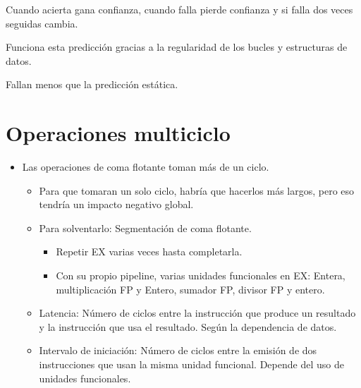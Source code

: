 \documentclass[12pt, twoside, openright]{report} %
\begin{document}
\begin{itemize}
\begin{itemize}
  Cuando acierta gana confianza, cuando falla pierde confianza y si falla dos veces seguidas cambia.

  Funciona esta predicción gracias a la regularidad de los bucles y estructuras de datos.

  Fallan menos que la predicción estática.
  
  \begin{figure}[H]
    {\def\svgwidth{.8\textwidth}
  }
  \end{figure}

  
\end{itemize}
    
\end{itemize}

\section{Operaciones multiciclo}

\begin{itemize}
\item Las operaciones de coma flotante toman más de un ciclo.
\begin{itemize}
  \item Para que tomaran un solo ciclo, habría que hacerlos más largos, pero eso tendría un impacto negativo global.
  \item Para solventarlo: Segmentación de coma flotante.
  \begin{itemize}
    \item Repetir EX varias veces hasta completarla.
    \item Con su propio pipeline, varias unidades funcionales en EX: Entera, multiplicación FP y Entero, sumador FP, divisor FP y entero.
    \begin{figure}[H]
      {\def\svgwidth{.8\textwidth}
  }
    \end{figure}
  
  \end{itemize}
      
  \item Latencia: Número de ciclos entre la instrucción que produce un resultado y la instrucción que usa el resultado. Según la dependencia de datos.
  
  \item Intervalo de iniciación: Número de ciclos entre la emisión de dos instrucciones que usan la misma unidad funcional. Depende del uso de unidades funcionales.
\end{itemize}
   

\end{itemize}
\end{document}
